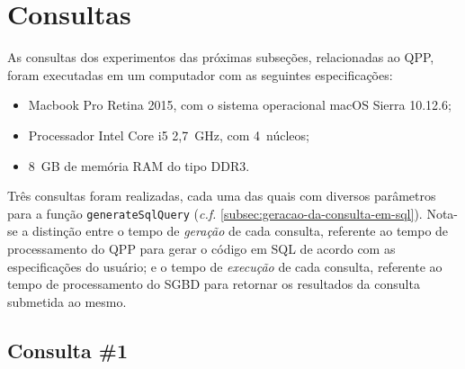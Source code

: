 
\section{Consultas}

As consultas dos experimentos das próximas subseções, relacionadas ao QPP, foram executadas em um computador com as seguintes especificações:

\begin{itemize}
	\item Macbook Pro Retina 2015, com o sistema operacional macOS Sierra 10.12.6;
    \item Processador Intel Core i5 2,7~GHz, com 4~núcleos;
    \item 8~GB de memória RAM do tipo DDR3.
\end{itemize}

Três consultas foram realizadas, cada uma das quais com diversos parâmetros para a função \texttt{generateSqlQuery} (\textit{c.f.} \autoref{subsec:geracao-da-consulta-em-sql}). Nota-se a distinção entre o tempo de \emph{geração} de cada consulta, referente ao tempo de processamento do QPP para gerar o código em SQL de acordo com as especificações do usuário; e o tempo de \emph{execução} de cada consulta, referente ao tempo de processamento do SGBD para retornar os resultados da consulta submetida ao mesmo.

\subsection{Consulta \#1}

%

%

